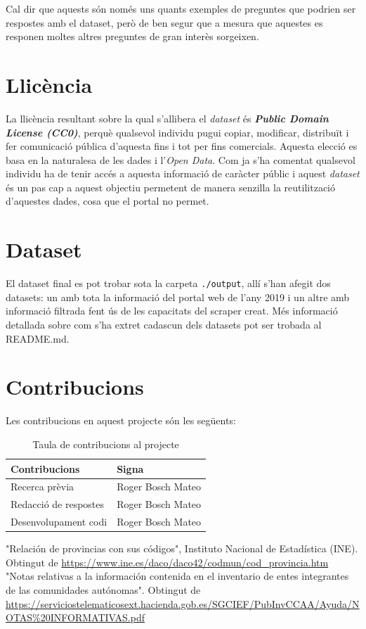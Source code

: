 \documentclass[12pt]{article}
\begin{document}
Cal dir que aquests són només uns quants exemples de preguntes que podrien ser respostes amb el dataset, però de ben segur que a mesura que aquestes es responen moltes altres preguntes de gran interès sorgeixen.


\section*{Llicència}
La llicència resultant sobre la qual s'allibera el \textit{dataset} és \textit{\textbf{Public Domain License (CC0)}}, perquè qualsevol individu pugui copiar, modificar, distribuït i fer comunicació pública d'aquesta fins i tot per fins comercials.
Aquesta elecció es basa en la naturalesa de les dades i l'\textit{Open Data}. Com ja s'ha comentat qualsevol individu ha de tenir accés a aquesta informació de caràcter públic i aquest \textit{dataset} és un pas cap a aquest objectiu permetent de manera senzilla la reutilització d'aquestes dades, cosa que el portal no permet.

\section*{Dataset}
El dataset final es pot trobar sota la carpeta \texttt{./output}, allí s'han afegit dos datasets: un amb tota la informació del portal web de l'any 2019 i un altre amb informació filtrada fent ús de les capacitats del scraper creat. Més informació detallada sobre com s'ha extret cadascun dels datasets pot ser trobada al README.md.

\newpage
\section*{Contribucions}
Les contribucions en aquest projecte són les següents:
\begin{table}[h!]
    \centering
     \begin{tabular}{p{5cm}p{5cm}} 
     \hline
     \textbf{Contribucions} & \textbf{Signa} \\
     \hline
     Recerca prèvia & Roger Bosch Mateo \\
     Redacció de respostes & Roger Bosch Mateo \\
     Desenvolupament codi & Roger Bosch Mateo \\
     \hline
    \end{tabular}
    \caption{Taula de contribucions al projecte}
    \label{ComparativaAPITwitter}
\end{table}

\newpage
\begin{thebibliography}{9}
    "Relación de provincias con sus códigos", Instituto Nacional de Estadística (INE). Obtingut de \url{https://www.ine.es/daco/daco42/codmun/cod_provincia.htm}
    "Notas relativas a la información contenida en el inventario de entes integrantes de las comunidades autónomas". Obtingut de \url{https://serviciostelematicosext.hacienda.gob.es/SGCIEF/PubInvCCAA/Ayuda/NOTAS\%20INFORMATIVAS.pdf}
\end{thebibliography}
\end{document}

